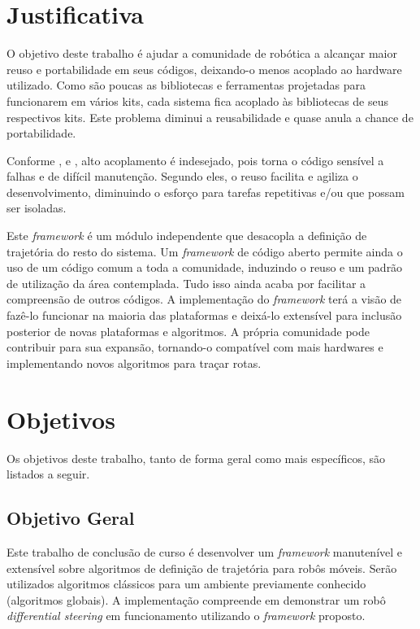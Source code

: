 \section{Justificativa}

O objetivo deste trabalho é ajudar a comunidade de robótica a alcançar maior reuso e portabilidade em seus códigos, deixando-o menos acoplado ao hardware utilizado. Como são poucas as bibliotecas e ferramentas projetadas para funcionarem em vários kits, cada sistema fica acoplado às bibliotecas de seus respectivos kits. Este problema diminui a reusabilidade e quase anula a chance de portabilidade.

Conforme \cite{Larman2005}, \cite{Goodliffe2007} e \cite{McConnel2004}, alto acoplamento é indesejado, pois torna o código sensível a falhas e de difícil manutenção. Segundo eles, o reuso facilita e agiliza o desenvolvimento, diminuindo o esforço para tarefas repetitivas e/ou que possam ser isoladas.

Este \textit{framework} é um módulo independente que desacopla a definição de trajetória do resto do sistema. Um \textit{framework} de código aberto permite ainda o uso de um código comum a toda a comunidade, induzindo o reuso e um padrão de utilização da área contemplada. Tudo isso ainda acaba por facilitar a compreensão de outros códigos. A implementação do \textit{framework} terá a visão de fazê-lo funcionar na maioria das plataformas e deixá-lo extensível para inclusão posterior de novas plataformas e algoritmos. A própria comunidade pode contribuir para sua expansão, tornando-o compatível com mais hardwares e implementando novos algoritmos para traçar rotas.

\section{Objetivos}

Os objetivos deste trabalho, tanto de forma geral como mais específicos, são listados a seguir.

\subsection{Objetivo Geral}

Este trabalho de conclusão de curso é desenvolver um \textit{framework} manutenível e extensível sobre algoritmos de definição de trajetória para robôs móveis. Serão utilizados algoritmos clássicos para um ambiente previamente conhecido (algoritmos globais). A implementação compreende em demonstrar um robô \textit{differential steering} em funcionamento utilizando o \textit{framework} proposto.

